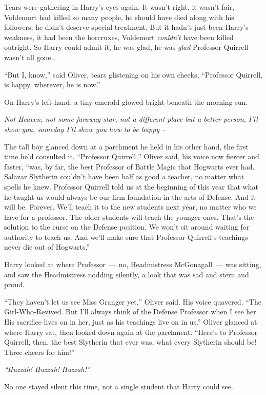 Tears were gathering in Harry's eyes again. It wasn't right, it wasn't fair, Voldemort had killed so many people, he should have died along with his followers, he didn't deserve special treatment. But it hadn't just been Harry's weakness, it had been the horcruxes, Voldemort \emph{couldn't} have been killed outright. So Harry could admit it, he was glad, he was \emph{glad} Professor Quirrell wasn't all gone...

``But I, know,'' said Oliver, tears glistening on his own cheeks, ``Professor Quirrell, is happy, wherever, he is now.''

On Harry's left hand, a tiny emerald glowed bright beneath the morning sun.

\emph{Not Heaven, not some faraway star, not a different place but a better person, I'll show you, someday I'll show you how to be happy -}

The tall boy glanced down at a parchment he held in his other hand, the first time he'd consulted it. ``Professor Quirrell,'' Oliver said, his voice now fiercer and faster, ``was, by far, the best Professor of Battle Magic that Hogwarts ever had. Salazar Slytherin couldn't have been half as good a teacher, no matter what spells he knew. Professor Quirrell told us at the beginning of this year that what he taught us would always be our firm foundation in the arts of Defense. And it will be. Forever. We'll teach it to the new students next year, no matter who we have for a professor. The older students will teach the younger ones. That's the solution to the curse on the Defense position. We won't sit around waiting for authority to teach us. And we'll make sure that Professor Quirrell's teachings never die out of Hogwarts.''

Harry looked at where Professor~--- no, Headmistress McGonagall~--- was sitting, and saw the Headmistress nodding silently, a look that was sad and stern and proud.

``They haven't let us see Miss Granger yet,'' Oliver said. His voice quavered. ``The Girl-Who-Revived. But I'll always think of the Defense Professor when I see her. His sacrifice lives on in her, just as his teachings live on in us.'' Oliver glanced at where Harry sat, then looked down again at the parchment. ``Here's to Professor Quirrell, then, the best Slytherin that ever was, what every Slytherin should be! Three cheers for him!''

\emph{``Huzzah! Huzzah! Huzzah!''}

No one stayed silent this time, not a single student that Harry could see.

